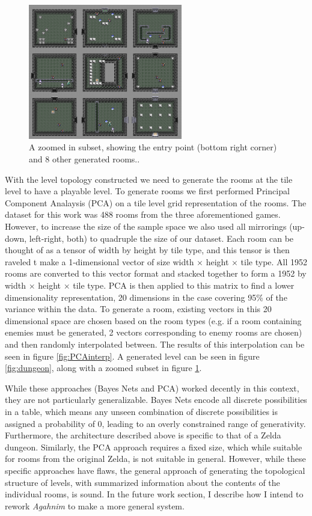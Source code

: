 \documentclass[12pt]{report}
\begin{document}
\begin{figure}[htbp!]
\centering
    \includegraphics[width=0.6\textwidth]{figures/lttp1_zoom.png}
    \caption{A zoomed in subset, showing the entry point (bottom right corner) and 8 other generated rooms..}
  \label{fig:dungeon_zoom}
\end{figure}
With the level topology constructed we need to generate the rooms at the tile level to have a playable level.  To generate rooms we first performed Principal Component Analaysis (PCA) on a tile level grid representation of the rooms. The dataset for this work was 488 rooms from the three aforementioned games.  However, to increase the size of the sample space we also used all mirrorings (up-down, left-right, both) to quadruple the size of our dataset. Each room can be thought of as a tensor of width by height by tile type, and this tensor is then raveled t make a 1-dimensional vector of size width $\times$ height $\times$ tile type.  All 1952 rooms are converted to this vector format and stacked together to form a 1952 by width $\times$ height $\times$ tile type.  PCA is then applied to this matrix to find a lower dimensionality representation, 20 dimensions in the case covering 95\% of the variance within the data.  To generate a room, existing vectors in this 20 dimensional space are chosen based on the room types (e.g. if a room containing enemies must be generated, 2 vectors corresponding to enemy rooms are chosen) and then randomly interpolated between.  The results of this interpolation can be seen in figure \ref{fig:PCAinterp}. A generated level can be seen in figure \ref{fig:dungeon}, along with a zoomed subset in figure \ref{fig:dungeon_zoom}.  

While these approaches (Bayes Nets and PCA) worked decently in this context, they are not particularly generalizable.  Bayes Nets encode all discrete possibilities in a table, which means any unseen combination of discrete possibilities is assigned a probability of 0, leading to an overly constrained range of generativity.  Furthermore, the architecture described above is specific to that of a Zelda dungeon.  Similarly, the PCA approach requires a fixed size, which while suitable for rooms from the original Zelda, is not suitable in general.  However, while these specific approaches have flaws, the general approach of generating the topological structure of levels, with summarized information about the contents of the individual rooms, is sound.  In the future work section, I describe how I intend to rework \textit{Agahnim} to make a more general system.
\end{document}
